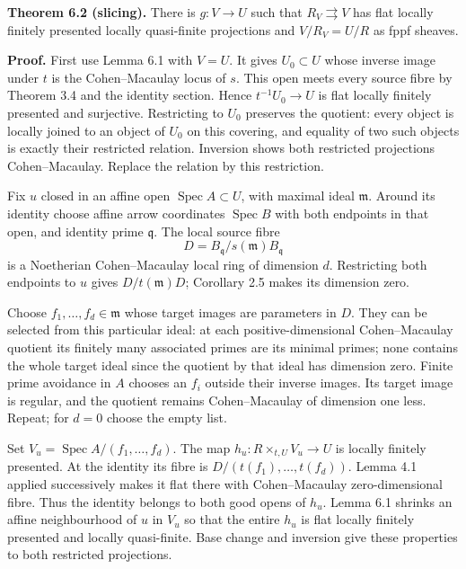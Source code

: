 \documentclass[11pt,a4paper,openany]{report}
\newcounter{none}
\begin{document}
\textbf{Theorem 6.2 (slicing).} There is \(g:V\to U\) such that \(R_V\rightrightarrows V\) has flat locally finitely presented locally quasi-finite projections and \(V/R_V=U/R\) as fppf sheaves.

\textbf{Proof.} First use Lemma 6.1 with \(V=U\). It gives \(U_0\subset U\) whose inverse image under \(t\) is the Cohen--Macaulay locus of \(s\). This open meets every source fibre by Theorem 3.4 and the identity section. Hence \(t^{-1}U_0\to U\) is flat locally finitely presented and surjective. Restricting to \(U_0\) preserves the quotient: every object is locally joined to an object of \(U_0\) on this covering, and equality of two such objects is exactly their restricted relation. Inversion shows both restricted projections Cohen--Macaulay. Replace the relation by this restriction.

Fix \(u\) closed in an affine open \(\operatorname{Spec}A\subset U\), with maximal ideal \(\mathfrak m\). Around its identity choose affine arrow coordinates \(\operatorname{Spec}B\) with both endpoints in that open, and identity prime \(\mathfrak q\). The local source fibre \[
  D=B_{\mathfrak q}/s(\mathfrak m)B_{\mathfrak q}
  \] is a Noetherian Cohen--Macaulay local ring of dimension \(d\). Restricting both endpoints to \(u\) gives \(D/t(\mathfrak m)D\); Corollary 2.5 makes its dimension zero.

Choose \(f_1,\ldots,f_d\in\mathfrak m\) whose target images are parameters in \(D\). They can be selected from this particular ideal: at each positive-dimensional Cohen--Macaulay quotient its finitely many associated primes are its minimal primes; none contains the whole target ideal since the quotient by that ideal has dimension zero. Finite prime avoidance in \(A\) chooses an \(f_i\) outside their inverse images. Its target image is regular, and the quotient remains Cohen--Macaulay of dimension one less. Repeat; for \(d=0\) choose the empty list.

Set \(V_u=\operatorname{Spec}A/(f_1,\ldots,f_d)\). The map \(h_u:R\times_{t,U}V_u\to U\) is locally finitely presented. At the identity its fibre is \(D/(t(f_1),\ldots,t(f_d))\). Lemma 4.1 applied successively makes it flat there with Cohen--Macaulay zero-dimensional fibre. Thus the identity belongs to both good opens of \(h_u\). Lemma 6.1 shrinks an affine neighbourhood of \(u\) in \(V_u\) so that the entire \(h_u\) is flat locally finitely presented and locally quasi-finite. Base change and inversion give these properties to both restricted projections.
\end{document}
